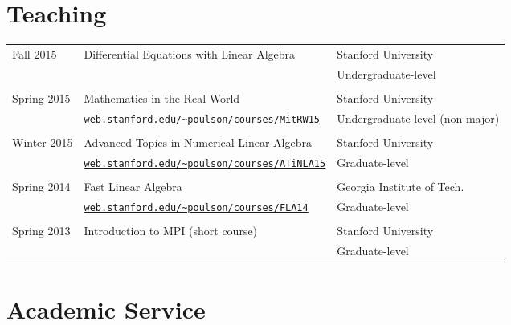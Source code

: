 \documentclass[letterpaper]{article}
\renewenvironment{itemize}{
  \begin{list}{}{
    \setlength{\leftmargin}{1.5em}
  }
}{
  \end{list}
}
\begin{document}
\section*{Teaching}
\begin{tabular}{lll}
Fall 2015 & Differential Equations with Linear Algebra & Stanford University \\
          &      & Undergraduate-level \\
  & & \\
Spring 2015 & Mathematics in the Real World               & Stanford University \\
            & \href{http://web.stanford.edu/~poulson/courses/MitRW15}{\tt web.stanford.edu/\textasciitilde poulson/courses/MitRW15} & Undergraduate-level (non-major) \\
 & & \\
Winter 2015 & Advanced Topics in Numerical Linear Algebra & Stanford University \\
            & \href{http://web.stanford.edu/~poulson/courses/ATiNLA15}{\tt web.stanford.edu/\textasciitilde poulson/courses/ATiNLA15} & Graduate-level \\
 & & \\
Spring 2014 & Fast Linear Algebra                         & Georgia Institute of Tech.\ \\
            & \href{http://web.stanford.edu/~poulson/courses/FLA14}{\tt web.stanford.edu/\textasciitilde poulson/courses/FLA14} & Graduate-level \\
 & & \\
Spring 2013 & Introduction to MPI (short course)          & Stanford University \\
            & & Graduate-level \\
\end{tabular}


\section*{Academic Service}
\end{document}
